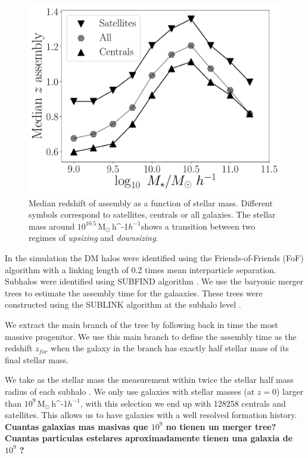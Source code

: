 \documentclass[fleqn,usenatbib]{mnras}
\newcommand{\Msunh}{\,{\rm M}$_{\odot}$\,\ifmmode h^{-1}\else $h^{-1}$\fi}
\begin{document}
\begin{figure}
    \centering
    \includegraphics[width=1\columnwidth]{figuras/median_assembly.pdf}
    \caption{Median redshift of assembly as a function of stellar mass.
    Different symbols correspond to satellites, centrals or all galaxies.
    The stellar mass around $10^{10.5}$\Msunh shows a transition between two 
    regimes of \emph{upsizing} and \emph{downsizing}.}
    \label{fig:median_assembly}
\end{figure}


In the simulation the DM halos were identified using the
Friends-of-Friends (FoF) algorithm with a linking length of 0.2 times
mean interparticle separation. 
Subhalos were identified using SUBFIND algorithm
\citep{2015MNAS.449...49R}. 
We use the baryonic merger trees to estimate the assembly time for the
galaaxies.
These trees were constructed using the SUBLINK algorithm at the
subhalo level \citep{2015MNRAS.449...49R}.

We extract the main branch of the tree by following back in time the
most massive progenitor.
We use this main branch to define the assembly time as the redshift
$z_{for}$ when the galaxy in the branch has exactly half stellar mass
of its final stellar mass.  

We take as the stellar mass the measurement within
twice the stellar half mass radius of each subhalo
\citep{2018MNRAS.475..676S}.
We only use galaxies with stellar masses (at $z=0$) larger than
$10^{9}$\Msunh,   with this selection we end up with 128258 centrals
and  satellites.
This allows us to have galaxies with a well resolved formation
history. 
\textbf{Cuantas galaxias mas masivas que $10^9$ no tienen un merger
  tree?}  
\textbf{Cuantas particulas estelares aproximadamente tienen una
  galaxia de $10^9$ ?} 
\end{document}
